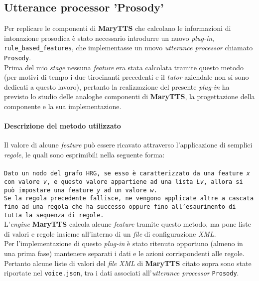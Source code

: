       \subsection{Utterance processor 'Prosody'}
                Per replicare le componenti di \textbf{MaryTTS} che calcolano le informazioni di intonazione prosodica è stato necessario 
                introdurre un nuovo \textit{plug-in}, \texttt{rule\_based\_features}, che implementasse un nuovo \textit{utterance processor} 
                chiamato \texttt{Prosody}. \\ Prima del mio \textit{stage} nessuna \textit{feature} era stata calcolata tramite questo metodo
                (per motivi di tempo i due tirocinanti precedenti e il \textit{tutor} aziendale non si sono dedicati a questo lavoro),
                pertanto la realizzazione del presente \textit{plug-in} ha previsto lo studio delle analoghe componenti di \textbf{MaryTTS},
                la progettazione della componente e la sua implementazione. \\
                
                \paragraph{Descrizione del metodo utilizzato}
                Il valore di alcune \textit{feature} può essere ricavato attraverso l'applicazione di semplici \textit{regole},
                le quali sono esprimibili nella seguente forma:
	\\ \\
          \texttt{Dato un nodo del grafo HRG, se esso è caratterizzato da una feature \textit{x} con valore \textit{v}, e questo
		  valore appartiene ad una lista \textit{Lv}, allora si può impostare una feature \textit{y} ad un valore \textit{w}. \\
		  Se la regola precedente fallisce, ne vengono applicate altre a cascata fino ad una regola che ha successo oppure fino
		  all'esaurimento di tutta la sequenza di regole.} \\ 

                L'\textit{engine} \textbf{MaryTTS} calcola alcune \textit{feature} tramite questo metodo,
                ma pone liste di valori e regole insieme all'interno
                di un \textit{file} di configurazione \textit{XML}. \\ Per l'implementazione di questo \textit{plug-in} è stato ritenuto opportuno	
                (almeno in una prima fase) mantenere separati i dati e le azioni corrispondenti alle regole. \\ Pertanto alcune liste di valori
                del \textit{file} \textit{XML} di \textbf{MaryTTS} citato sopra sono state riportate nel \texttt{voice.json}, tra i dati  
                associati all'\textit{utterance processor} \texttt{Prosody}.

